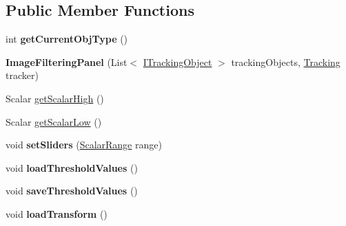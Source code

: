 \subsection*{Public Member Functions}
\begin{DoxyCompactItemize}
\item 
\hypertarget{classairhockeyjava_1_1graphics_1_1_image_filtering_panel_ad720453f65f75e546b64afdd5ccaa09b}{}int {\bfseries get\+Current\+Obj\+Type} ()\label{classairhockeyjava_1_1graphics_1_1_image_filtering_panel_ad720453f65f75e546b64afdd5ccaa09b}

\item 
\hypertarget{classairhockeyjava_1_1graphics_1_1_image_filtering_panel_a32aa012930170cf7c40245850c02bc8e}{}{\bfseries Image\+Filtering\+Panel} (List$<$ \hyperlink{interfaceairhockeyjava_1_1detection_1_1_i_tracking_object}{I\+Tracking\+Object} $>$ tracking\+Objects, \hyperlink{classairhockeyjava_1_1detection_1_1_tracking}{Tracking} tracker)\label{classairhockeyjava_1_1graphics_1_1_image_filtering_panel_a32aa012930170cf7c40245850c02bc8e}

\item 
Scalar \hyperlink{classairhockeyjava_1_1graphics_1_1_image_filtering_panel_a890406ade615347bb517f49277b11f8d}{get\+Scalar\+High} ()
\item 
Scalar \hyperlink{classairhockeyjava_1_1graphics_1_1_image_filtering_panel_a627bbd84e6eb7a45f4264a247e8e5e3b}{get\+Scalar\+Low} ()
\item 
\hypertarget{classairhockeyjava_1_1graphics_1_1_image_filtering_panel_adb96f7a71efec95e9b3c5b4965269fdf}{}void {\bfseries set\+Sliders} (\hyperlink{classairhockeyjava_1_1util_1_1_scalar_range}{Scalar\+Range} range)\label{classairhockeyjava_1_1graphics_1_1_image_filtering_panel_adb96f7a71efec95e9b3c5b4965269fdf}

\item 
\hypertarget{classairhockeyjava_1_1graphics_1_1_image_filtering_panel_a1c2ac0498acda086f000ce251dd3737b}{}void {\bfseries load\+Threshold\+Values} ()\label{classairhockeyjava_1_1graphics_1_1_image_filtering_panel_a1c2ac0498acda086f000ce251dd3737b}

\item 
\hypertarget{classairhockeyjava_1_1graphics_1_1_image_filtering_panel_a23d49600005fe319489cddf12bcaf50e}{}void {\bfseries save\+Threshold\+Values} ()\label{classairhockeyjava_1_1graphics_1_1_image_filtering_panel_a23d49600005fe319489cddf12bcaf50e}

\item 
\hypertarget{classairhockeyjava_1_1graphics_1_1_image_filtering_panel_a04ed4467ec0849f95e33adfce4bed039}{}void {\bfseries load\+Transform} ()\label{classairhockeyjava_1_1graphics_1_1_image_filtering_panel_a04ed4467ec0849f95e33adfce4bed039}


\end{DoxyCompactItemize}
